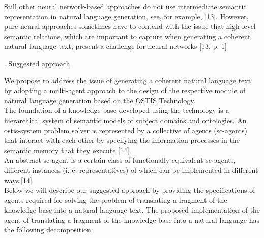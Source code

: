 \documentclass{scndocument}
\begin{document}
\begin{SCn}
\begin{multicols}{2}
\begin{justify}
Still other neural network-based approaches do not use
intermediate semantic representation in natural language
generation, see, for example, [13]. However, pure neural
approaches sometimes have to contend with the issue
that high-level semantic relations, which are important
to capture when generating a coherent natural language
text, present a challenge for neural networks [13, p. 1]
\end{justify}
\vspace{0.3cm}
\centerline{\MakeUppercase{}. Suggested approach}
\vspace{0.3cm}
\begin{justify}
We propose to address the issue of generating a
coherent natural language text by adopting a multi-agent
approach to the design of the respective module of natural
language generation based on the OSTIS Technology.\\
The foundation of a knowledge base developed using
the technology is a hierarchical system of semantic models of subject domains and ontologies. An ostis-system
problem solver is represented by a collective of agents
(sc-agents) that interact with each other by specifying the
information processes in the semantic memory that they
execute [14].\\ 
An abstract sc-agent is a certain class of functionally equivalent sc-agents, different instances (i. e. representatives) of which can be implemented in different
ways.[14]\\
Below we will describe our suggested approach by
providing the specifications of agents required for solving
the problem of translating a fragment of the knowledge
base into a natural language text.
The proposed implementation of the agent of translating a fragment of the knowledge base into a natural
language has the following decomposition:
\end{justify} 
\begin{flushleft}
    

\end{flushleft}
\end{multicols}
\end{SCn}
\end{document}
